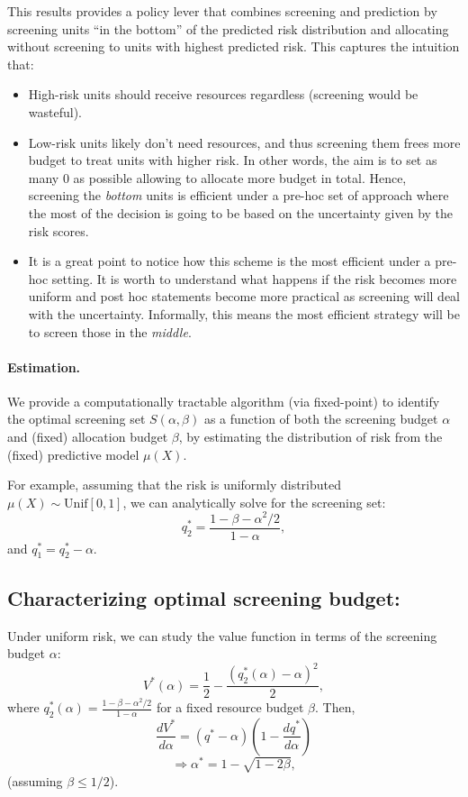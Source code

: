 \documentclass[11pt]{article}
\begin{document}
This results provides a policy lever that combines screening and prediction by screening units ``in the bottom'' of the predicted risk distribution and allocating without screening to units with highest predicted risk. This captures the intuition that: 
\begin{itemize}
    \item High-risk units should receive resources regardless (screening would be wasteful).

    
    \item Low-risk units likely don't need resources, and thus screening them frees more budget to treat units with higher risk. In other words, the aim is to set as many 0 as possible allowing to allocate more budget in total. Hence, screening the \textit{bottom} units is efficient under a pre-hoc set of approach where the most of the decision is going to be based on the uncertainty given by the risk scores.

    \item It is a great point to notice how this scheme is the most efficient under a pre-hoc setting. It is worth to understand what happens if the risk becomes more uniform and post hoc statements become more practical as screening will deal with the uncertainty. Informally, this means the most efficient strategy will be to screen those in the \textit{middle}.
\end{itemize}

\paragraph{Estimation.} We provide a computationally tractable algorithm (via fixed-point) to identify the optimal screening set $S(\alpha, \beta)$ as a function of both the screening budget $\alpha$ and (fixed) allocation budget $\beta$, by estimating the distribution of risk from the (fixed) predictive model $\mu(X)$.


For example, assuming that the risk is uniformly distributed $\mu(X) \sim \text{Unif}[0,1]$, we can analytically solve for the screening set:
$$q_2^* = \frac{1-\beta- \alpha^2/2}{1-\alpha},$$
and $q_1^* = q_2^* - \alpha.$



\subsection*{Characterizing optimal screening budget:}

Under uniform risk, we can study the value function in terms of the screening budget $\alpha$:
$$V^*(\alpha) = \frac{1}{2} - \frac{(q_2^*(\alpha) - \alpha)^2}{2},$$
where $q_2^*(\alpha) = \frac{1-\beta- \alpha^2/2}{1-\alpha}$ for a fixed resource budget $\beta$. Then, 
$$\frac{dV^*}{d\alpha} = (q^* - \alpha)\left(1-\frac{dq^*}{d\alpha}\right)$$
$$\Rightarrow \alpha^* = 1 - \sqrt{1-2\beta},$$
(assuming $\beta \leq 1/2$).
\end{document}
